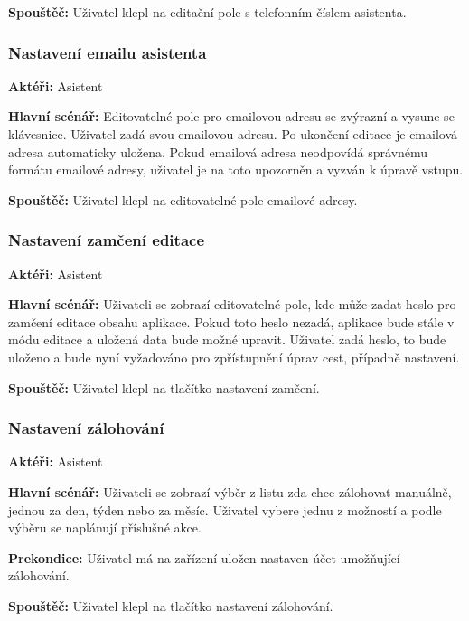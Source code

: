 \documentclass{article}
\newcommand{\usecase}[2]{\subsubsection{#1}\label{#2}}
\begin{document}
\vspace{0.1cm}
\noindent
\textbf{Spouštěč:} Uživatel klepl na editační pole s telefonním číslem asistenta.

\usecase{Nastavení emailu asistenta}{nastaveniemailu}
\textbf{Aktéři:} Asistent

\vspace{0.1cm}
\noindent
\textbf{Hlavní scénář:} Editovatelné pole pro emailovou adresu se zvýrazní a vysune se klávesnice.
Uživatel zadá svou emailovou adresu. Po ukončení editace je emailová adresa automaticky uložena.
Pokud emailová adresa neodpovídá správnému formátu emailové adresy, uživatel je na toto upozorněn
a vyzván k úpravě vstupu.

\vspace{0.1cm}
\noindent
\textbf{Spouštěč:} Uživatel klepl na editovatelné pole emailové adresy.


\usecase{Nastavení zamčení editace}{nastavenizamceni}
\textbf{Aktéři:} Asistent

\vspace{0.1cm}
\noindent
\textbf{Hlavní scénář:} Uživateli se zobrazí editovatelné pole, kde může zadat heslo pro zamčení editace
obsahu aplikace. Pokud toto heslo nezadá, aplikace bude stále v módu editace a uložená data bude možné upravit.
Uživatel zadá heslo, to bude uloženo a bude nyní vyžadováno pro zpřístupnění úprav cest, případně nastavení.

\vspace{0.1cm}
\noindent
\textbf{Spouštěč:} Uživatel klepl na tlačítko nastavení zamčení.

\usecase{Nastavení zálohování}{nastavenizalohovani}
\textbf{Aktéři:} Asistent

\vspace{0.1cm}
\noindent
\textbf{Hlavní scénář:} Uživateli se zobrazí výběr z listu zda chce zálohovat manuálně, jednou za den, týden
nebo za měsíc. Uživatel vybere jednu z možností a podle výběru se naplánují příslušné akce.

\vspace{0.1cm}
\noindent
\textbf{Prekondice:} Uživatel má na zařízení uložen nastaven účet umožňující zálohování.

\vspace{0.1cm}
\noindent
\textbf{Spouštěč:} Uživatel klepl na tlačítko nastavení zálohování.
\end{document}
